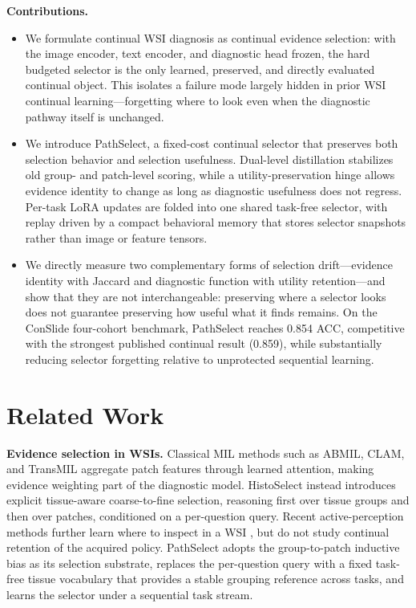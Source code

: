 \documentclass{article}
\begin{document}
\textbf{Contributions.}
\begin{itemize}
    \item We formulate continual WSI diagnosis as continual evidence selection: with the image encoder, text encoder, and diagnostic head frozen, the hard budgeted selector is the only learned, preserved, and directly evaluated continual object. This isolates a failure mode largely hidden in prior WSI continual learning---forgetting where to look even when the diagnostic pathway itself is unchanged.
    \item We introduce PathSelect, a fixed-cost continual selector that preserves both selection behavior and selection usefulness. Dual-level distillation stabilizes old group- and patch-level scoring, while a utility-preservation hinge allows evidence identity to change as long as diagnostic usefulness does not regress. Per-task LoRA updates are folded into one shared task-free selector, with replay driven by a compact behavioral memory that stores selector snapshots rather than image or feature tensors.
    \item We directly measure two complementary forms of selection drift---evidence identity with Jaccard and diagnostic function with utility retention---and show that they are not interchangeable: preserving where a selector looks does not guarantee preserving how useful what it finds remains. On the ConSlide four-cohort benchmark, PathSelect reaches 0.854 ACC, competitive with the strongest published continual result (0.859), while substantially reducing selector forgetting relative to unprotected sequential learning.
\end{itemize}

\section{Related Work}
\label{sec:related}

\textbf{Evidence selection in WSIs.}
Classical MIL methods such as ABMIL, CLAM, and TransMIL \cite{ilse2018abmil,lu2021clam,shao2021transmil} aggregate patch features through learned attention, making evidence weighting part of the diagnostic model. HistoSelect \cite{huang2026histoselect} instead introduces explicit tissue-aware coarse-to-fine selection, reasoning first over tissue groups and then over patches, conditioned on a per-question query. Recent active-perception methods further learn where to inspect in a WSI \cite{chen2026adaptivepath}, but do not study continual retention of the acquired policy. PathSelect adopts the group-to-patch inductive bias as its selection substrate, replaces the per-question query with a fixed task-free tissue vocabulary that provides a stable grouping reference across tasks, and learns the selector under a sequential task stream.
\end{document}
